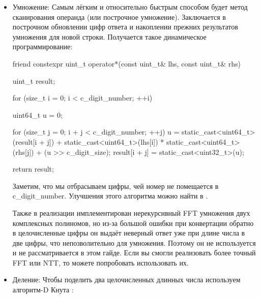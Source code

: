 \begin{itemize}
\begin{cppcode}
{    ++*this;
}
  \end{cppcode}
  Значит отрицанием будет:
  \begin{cppcode}
constexpr uint_t operator-() const {
    uint_t result = *this;
    result.negative();
    return result;
}
  \end{cppcode}
  Определяем внешние friend для вычитания:
  \begin{cppcode}
friend constexpr uint_t operator-(const uint_t& lhs, const uint_t& rhs) {
    uint_t result = lhs;
    result -= rhs;
    return result;
}

friend constexpr uint_t operator-(uint_t&& lhs, const uint_t& rhs) {
    lhs -= rhs;
    return lhs;
}

friend constexpr uint_t operator-(const uint_t& lhs, uint_t&& rhs) {
    rhs -= lhs;
    rhs.negative();
    return rhs;
}

friend constexpr uint_t operator-(uint_t&& lhs, uint_t&& rhs) {
    lhs -= rhs;
    return lhs;
}
  \end{cppcode}
  \item Умножение:
    Самым лёгким и относительно быстрым способом будет метод сканирования операнда (или построчное умножение). Заключается в построчном обновлении цифр ответа и накоплении прежних результатов умножения для новой строки. Получается такое динамическое программирование:
    \begin{cppcode}
friend constexpr uint_t operator*(const uint_t& lhs, const uint_t& rhs) {
    uint_t result;

    for (size_t i = 0; i < c_digit_number; ++i) {
        uint64_t u = 0;

        for (size_t j = 0; i + j < c_digit_number; ++j) {
            u = static_cast<uint64_t>(result[i + j])
              + static_cast<uint64_t>(lhs[i]) * static_cast<uint64_t>(rhs[j])
              + (u >> c_digit_size);
            result[i + j] = static_cast<uint32_t>(u);
        }
    }

    return result;
}
    \end{cppcode}
    Заметим, что мы отбрасываем цифры, чей номер не помещается в c\_digit\_number. Улучшения этого алгоритма можно найти в \cite{fast_mult}.

    Также в реализации имплементирован нерекурсивный FFT умножения двух комплексных полиномов, но из-за большой ошибки при конвертации обратно в целочисленные цифры он выдаёт неверный ответ уже при длине числа в две цифры, что непозволительно для умножения. Поэтому он не используется и не рассматривается в этом гайде. Если вы смогли реализовать более точный FFT или NTT, то можете попробовать использовать их.
  \item Деление:
    Чтобы поделить два целочисленных длинных числа используем алгоритм-D Кнута \cite{knuth2014art}:


\end{itemize}
